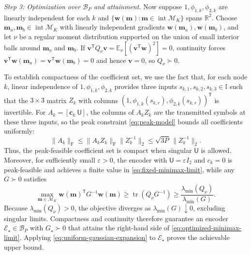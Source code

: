 \documentclass[journal,12pt,onecolumn,draftclsnofoot]{IEEEtran}
\newcommand{\enc}{\mathscr{E}}\newcommand{\dec}{\mathscr{D}}\newcommand{\R}{\mathbb R}\newcommand{\C}{\mathbb C}
\newcommand{\T}{\mathsf T}\newcommand{\suc}{\succeq}
\begin{document}
\emph{Step 3: Optimization over $\mathcal B_P$ and attainment.}
Now suppose $1,\phi_{1,k},\phi_{2,k}$ are linearly independent for each $k$ and $\{\boldsymbol w(\boldsymbol m):\boldsymbol m\in\operatorname{int}\mathcal M_K\}$ spans $\R^2$.
Choose $\boldsymbol m_a,\boldsymbol m_b\in\operatorname{int}\mathcal M_K$ with linearly independent gradients $\boldsymbol w(\boldsymbol m_a),\boldsymbol w(\boldsymbol m_b)$, and let $\nu$ be a regular moment distribution supported on the union of small interior balls around $\boldsymbol m_a$ and $\boldsymbol m_b$.
If $\boldsymbol v^\T Q_\nu\boldsymbol v=\mathbb E_\nu[(\boldsymbol v^\T\boldsymbol w)^2]=0$, continuity forces $\boldsymbol v^\T\boldsymbol w(\boldsymbol m_a)=\boldsymbol v^\T\boldsymbol w(\boldsymbol m_b)=0$ and hence $\boldsymbol v=0$, so $Q_\nu\succ0$.

To establish compactness of the coefficient set, we use the fact that, for each node $k$, linear independence of $1,\phi_{1,k},\phi_{2,k}$ provides three inputs $s_{k,1},s_{k,2},s_{k,3}\in\mathbb I$ such that the $3\times 3$ matrix $Z_k$ with columns $(1,\phi_{1,k}(s_{k,r}),\phi_{2,k}(s_{k,r}))^\T$ is invertible.
For $A_k=[\boldsymbol c_k\ \mathsf U]$, the columns of $A_kZ_k$ are the transmitted symbols at these three inputs, so the peak constraint \eqref{eq:peak-model} bounds all coefficients uniformly:
$$
 \|A_k\|_{\mathrm F}
 \le\|A_kZ_k\|_{\mathrm F}\|Z_k^{-1}\|_2
 \le\sqrt{3P}\,\|Z_k^{-1}\|_2.
$$
Thus, the peak-feasible coefficient set is compact when singular $\mathsf U$ is allowed.
Moreover, for sufficiently small $\varepsilon>0$, the encoder with $\mathsf U=\varepsilon I_2$ and $c_k=0$ is peak-feasible and achieves a finite value in \eqref{eq:fixed-minimax-limit}, while any $G\succ0$ satisfies
$$
 \max_{\boldsymbol m\in\mathcal M_K}
 \boldsymbol w(\boldsymbol m)^\T G^{-1}\boldsymbol w(\boldsymbol m)
 \ge\operatorname{tr}(Q_\nu G^{-1})
 \ge\frac{\lambda_{\min}(Q_\nu)}{\lambda_{\min}(G)}.
$$
Because $\lambda_{\min}(Q_\nu)>0$, the objective diverges as $\lambda_{\min}(G)\downarrow0$, excluding singular limits.
Compactness and continuity therefore guarantee an encoder $\enc_\star\in\mathcal B_P$ with $G_\star\succ0$ that attains the right-hand side of \eqref{eq:optimized-minimax-limit}. Applying \eqref{eq:uniform-gaussian-expansion} to $\enc_\star$ proves the achievable upper bound.
\end{document}
